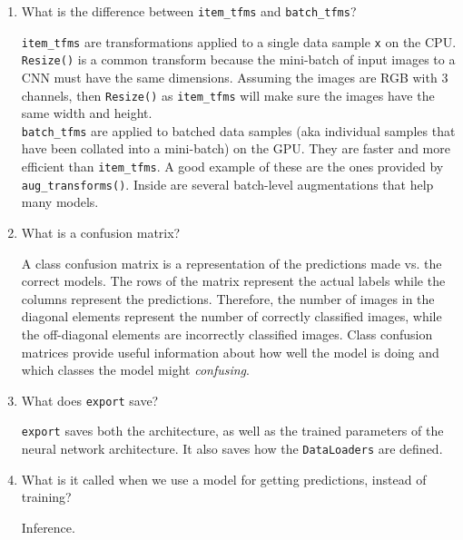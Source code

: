 \documentclass[12pt,a4paper]{article}
\begin{document}
\begin{enumerate}
\item What is the difference between \verb/item_tfms/ and \verb/batch_tfms/? \\

\smallbreak

\verb/item_tfms/ are transformations applied to a single data sample \verb/x/ on the CPU. \verb/Resize()/ is a common transform because the mini-batch of input images to a CNN must have the same dimensions. Assuming the images are RGB with 3 channels, then \verb/Resize()/ as \verb/item_tfms/ will make sure the images have the same width and height. \\
\smallbreak
\verb/batch_tfms/ are applied to batched data samples (aka individual samples that have been collated into a mini-batch) on the GPU. They are faster and more efficient than \verb/item_tfms/. A good example of these are the ones provided by \verb/aug_transforms()/. Inside are several batch-level augmentations that help many models. 
\item What is a confusion matrix? \\

\smallbreak

A class confusion matrix is a representation of the predictions made vs. the correct models. The rows of the matrix represent the actual labels while the columns represent the predictions. Therefore, the number of images in the diagonal elements represent the number of correctly classified images, while the off-diagonal elements are incorrectly classified images. Class confusion matrices provide useful information about how well the model is doing and which classes the model might \textit{confusing}.

\bigbreak

\item What does \verb/export/ save? \\

\smallbreak

\verb/export/ saves both the architecture, as well as the trained parameters of the neural network architecture. It also saves how the \verb/DataLoaders/ are defined.

\bigbreak

\item What is it called when we use a model for getting predictions, instead of training? \\

\smallbreak

Inference.

\bigbreak


\end{enumerate}
\end{document}
